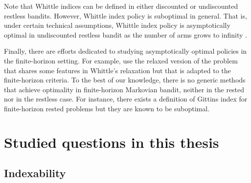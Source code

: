 Note that Whittle indices can be defined in either discounted or undiscounted restless bandits.
However, Whittle index policy is suboptimal in general.
That is, under certain technical assumptions, Whittle index policy is asymptotically optimal in undiscounted restless bandit as the number of arms grows to infinity \cite{weber1990index, lott2000optimality, verloop2016asymptotically}.

Finally, there are efforts dedicated to studying asymptotically optimal policies in the finite-horizon setting.
For example, \cite{hu2017asymptotically,brown2020index,zhang2021restless,gastGaujalYan-lpbased} use the relaxed version of the problem that shares some features in Whittle's relaxation but that is adapted to the finite-horizon criteria.
To the best of our knowledge, there is no generic methods that achieve optimality in finite-horizon Markovian bandit, neither in the rested nor in the restless case.
For instance, there exists a definition of Gittins index for finite-horizon rested problems but they are known to be suboptimal. 



\section{Studied questions in this thesis}
\label{ch:mb:sec:studied}

\subsection{Indexability}

